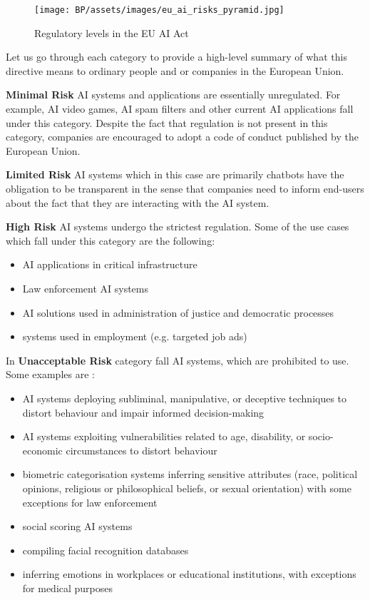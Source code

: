 \begin{figure}[h]
\begin{centering}
\texttt{[image: BP/assets/images/eu\_ai\_risks\_pyramid.jpg]}
\par\end{centering}
\caption{Regulatory levels in the EU AI Act \cite{eu_ai_regulation_picture}
 \label{fig:ai-act-pyramid}}
\end{figure}

Let us go through each category to provide a high-level summary of what this directive means to ordinary people and or companies in the European Union.

\textbf{Minimal Risk} AI systems and applications are essentially unregulated. For example, AI video games, AI spam filters and other current AI applications fall under this category. Despite the fact that regulation is not present in this category, companies are encouraged to adopt a code of conduct published by the European Union.

\textbf{Limited Risk} AI systems which in this case are primarily chatbots have the obligation to be transparent in the sense that companies need to inform end-users about the fact that they are interacting with the AI system.

\textbf{High Risk} AI systems undergo the strictest regulation. Some of the use cases which fall under this category are the following\cite{eu_ai_act_summary}:
\begin{itemize}
    \item AI applications in critical infrastructure
    \item Law enforcement AI systems
    \item AI solutions used in administration of justice and democratic processes
    \item systems used in employment (e.g. targeted job ads)
\end{itemize}

In \textbf{Unacceptable Risk} category fall AI systems, which are prohibited to use. Some examples are \cite{eu_ai_act_summary}:
\begin{itemize}
    \item AI systems deploying subliminal, manipulative, or deceptive techniques to distort behaviour and impair informed decision-making
    \item AI systems exploiting vulnerabilities related to age, disability, or socio-economic circumstances to distort behaviour
    \item biometric categorisation systems inferring sensitive attributes (race, political opinions, religious or philosophical beliefs, or sexual orientation) with some exceptions for law enforcement
    \item social scoring AI systems
    \item compiling facial recognition databases
    \item inferring emotions in workplaces or educational institutions, with exceptions for medical purposes
\end{itemize}

